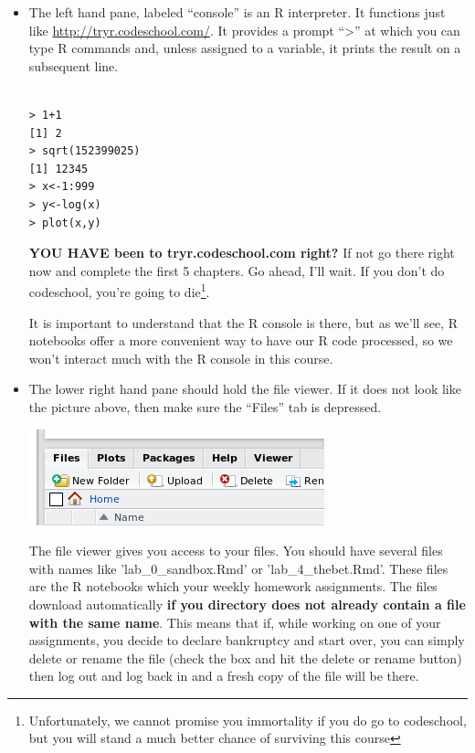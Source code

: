 \documentclass[11pt]{article}
\begin{document}
\begin{itemize}
\item The left hand pane, labeled ``console''  is an R interpreter.  It functions just like  \url{http://tryr.codeschool.com/}. It provides a prompt ``>'' at which you can type R commands and, unless assigned to a variable, it prints the result on a subsequent line.

\begin{verbatim}

> 1+1
[1] 2
> sqrt(152399025)
[1] 12345
> x<-1:999
> y<-log(x)
> plot(x,y)
\end{verbatim}



 \textbf{YOU HAVE been to tryr.codeschool.com right?} If not go there right now and complete the first 5 chapters.  Go ahead,  I'll wait.  If you don't do codeschool, you're going to die\footnote{Unfortunately, we cannot promise you immortality if you do go to codeschool, but you will stand a much better chance of surviving this course}.  

It is important to understand that the R console is there, but as we'll see, R notebooks offer a more convenient way to have our R code processed, so we won't interact much with the R console in this course.

\item The lower right hand pane should hold the file viewer. If it does not look like the picture above, then make sure the ``Files'' tab is depressed.

\includegraphics[scale=.5]{RstudioFiles}

The file viewer gives you access to your files.  You should have several files with names like 'lab\_0\_sandbox.Rmd' or 'lab\_4\_thebet.Rmd'.   These files are the R notebooks which your weekly homework assignments.  The files download automatically \textbf{if you directory does not already contain a file with the same name}.  This means that if, while working on one of your assignments, you decide to declare bankruptcy and start over, you can simply delete or rename the file (check the box and hit the delete or rename button) then log out and log back in and a fresh copy of the file will be there.


\end{itemize}
\end{document}
